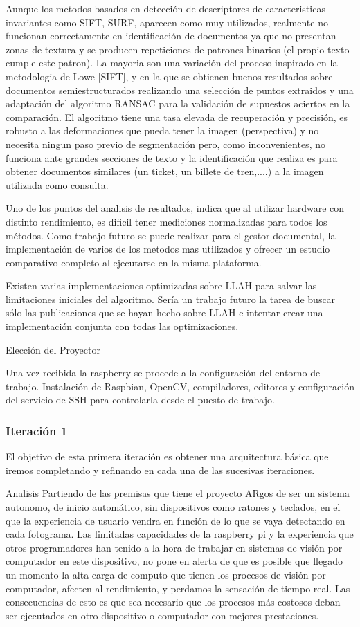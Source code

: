 Aunque los metodos basados en detección de descriptores de caracteristicas invariantes como SIFT, SURF, aparecen como muy utilizados, realmente no funcionan correctamente en identificación de documentos ya que no presentan zonas de textura y se producen repeticiones de patrones binarios (el propio texto cumple este patron). La mayoria son una variación del proceso inspirado en la metodologia de Lowe [SIFT], y en la que se obtienen buenos resultados sobre documentos semiestructurados realizando una selección de puntos extraidos y una adaptación del algoritmo RANSAC para la validación de supuestos aciertos en la comparación. El algoritmo tiene una tasa elevada de recuperación y precisión, es robusto a las deformaciones que pueda tener la imagen (perspectiva) y no necesita ningun paso previo de segmentación pero, como inconvenientes, no funciona ante grandes secciones de texto y la identificación que realiza es para obtener documentos similares (un ticket, un billete de tren,....) a la imagen utilizada como consulta.

Uno de los puntos del analisis de resultados, indica que al utilizar hardware con distinto rendimiento, es dificil tener mediciones normalizadas para todos los métodos. Como trabajo futuro se puede realizar para el gestor documental, la implementación de varios de los metodos mas utilizados y ofrecer un estudio comparativo completo al ejecutarse en la misma plataforma.

Existen varias implementaciones optimizadas sobre LLAH para salvar las limitaciones iniciales del algoritmo. Sería un trabajo futuro la tarea de buscar sólo las publicaciones que se hayan hecho sobre LLAH e intentar crear una implementación conjunta  con todas las optimizaciones. 

Elección del Proyector

Una vez recibida la raspberry se procede a la configuración del entorno de trabajo. Instalación de Raspbian, OpenCV, compiladores, editores y configuración del servicio de SSH para controlarla desde el puesto de trabajo.

\subsubsection{Iteración 1}
El objetivo de esta primera iteración es obtener una arquitectura básica que iremos completando y refinando en cada una de las sucesivas iteraciones.

Analisis
Partiendo de las premisas que tiene el proyecto ARgos de ser un sistema autonomo, de inicio automático, sin dispositivos como ratones y teclados, en el que la experiencia de usuario vendra en función de lo que se vaya detectando en cada fotograma. 
Las limitadas capacidades de la raspberry pi y la experiencia que otros programadores han tenido a la hora de trabajar en sistemas de visión por computador en este dispositivo, no pone en alerta de que es posible que llegado un momento la alta carga de computo que tienen los procesos de visión por computador, afecten al rendimiento, y perdamos la sensación de tiempo real. Las consecuencias de esto es que sea necesario que los procesos más costosos deban ser ejecutados en otro dispositivo o computador con mejores prestaciones.  

